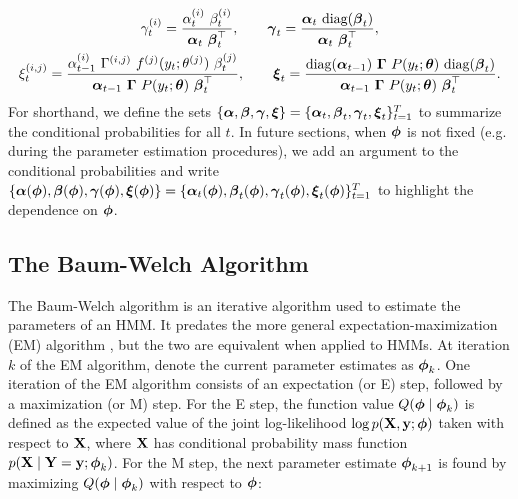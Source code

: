 \begin{gather}
    \gamma^{(i)}_t = \frac{\alpha^{(i)}_{t} ~ \beta^{(i)}_{t}}{\boldsymbol{\alpha}_{t} ~ \boldsymbol{\beta}_t^\top}, \qquad \boldsymbol{\gamma}_t = \frac{\boldsymbol{\alpha}_t ~ \text{diag}(\boldsymbol{\beta}_t)}{\boldsymbol{\alpha}_t ~ \boldsymbol{\beta}_t^\top} \label{eqn:gamma}, \\
    \xi_{t}^{(i,j)} = \frac{\alpha_{t-1}^{(i)} ~ \Gamma^{(i,j)} ~ f^{(j)}(y_{t};\theta^{(j)}) ~ \beta_{t}^{(j)}}{\boldsymbol{\alpha}_{t-1} ~ \boldsymbol{\Gamma} ~ P(y_{t};\boldsymbol{\theta}) ~ \boldsymbol{\beta}_{t}^\top}, \qquad \boldsymbol{\xi}_t = \frac{\text{diag}(\boldsymbol{\alpha}_{t-1}) ~ \boldsymbol{\Gamma} ~ P(y_t;\boldsymbol{\theta}) ~ \text{diag}(\boldsymbol{\beta}_t)}{\boldsymbol{\alpha}_{t-1} ~ \boldsymbol{\Gamma} ~ P(y_{t};\boldsymbol{\theta}) ~ \boldsymbol{\beta}_{t}^\top} \label{eqn:xi}.
\end{gather}
%
For shorthand, we define the sets $\{\boldsymbol{\alpha}, \boldsymbol{\beta}, \boldsymbol{\gamma}, \boldsymbol{\xi}\} = \{\boldsymbol{\alpha}_t, \boldsymbol{\beta}_t, \boldsymbol{\gamma}_t, \boldsymbol{\xi}_t\}_{t=1}^T$ to summarize the conditional probabilities for all $t$. In future sections, when $\boldsymbol{\phi}$ is not fixed (e.g. during the parameter estimation procedures), we add an argument to the conditional probabilities and write $\{\boldsymbol{\alpha}(\boldsymbol{\phi}), \boldsymbol{\beta}(\boldsymbol{\phi}), \boldsymbol{\gamma}(\boldsymbol{\phi}), \boldsymbol{\xi}(\boldsymbol{\phi})\} = \{\boldsymbol{\alpha}_t(\boldsymbol{\phi}), \boldsymbol{\beta}_t(\boldsymbol{\phi}), \boldsymbol{\gamma}_t(\boldsymbol{\phi}), \boldsymbol{\xi}_t(\boldsymbol{\phi})\}_{t=1}^T$ to highlight the dependence on $\boldsymbol{\phi}$. 

\subsection{The Baum-Welch Algorithm}

The Baum-Welch algorithm is an iterative algorithm used to estimate the parameters of an HMM. It predates the more general expectation-maximization (EM) algorithm \citep{Dempster:1977}, but the two are equivalent when applied to HMMs. At iteration $k$ of the EM algorithm, denote the current parameter estimates as $\boldsymbol{\phi}_{k}$. One iteration of the EM algorithm consists of an expectation (or E) step, followed by a maximization (or M) step. For the E step, the function value $Q(\boldsymbol{\phi} \mid \boldsymbol{\phi}_{k})$ is defined as the expected value of the joint log-likelihood $\log p(\mathbf{X},\mathbf{y}; \boldsymbol{\phi})$ taken with respect to $\mathbf{X}$, where $\mathbf{X}$ has conditional probability mass function $p(\mathbf{X} \mid \mathbf{Y} = \mathbf{y} ; \boldsymbol{\phi}_{k})$. For the M step, the next parameter estimate $\boldsymbol{\phi}_{k+1}$ is found by maximizing $Q(\boldsymbol{\phi} \mid \boldsymbol{\phi}_{k})$ with respect to $\boldsymbol{\phi}$:

